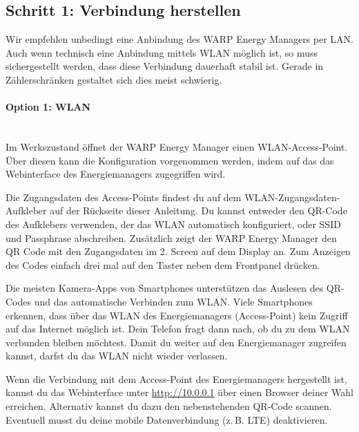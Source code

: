 \documentclass[a4paper,10pt]{article}
\newcommand{\hint}[1]{\begin{tcolorbox}[colback=boxgray,colframe=black,coltext=
white,title=Hinweis,left*=2mm,right*=2mm,boxsep=1mm,bottom=1mm,top=1mm]#1\end{tcolorbox}}
\begin{document}
\begin{multicols*}{2}
	\subsection{Schritt 1: Verbindung herstellen}


	\hint{Wir empfehlen unbedingt eine Anbindung des WARP Energy Managers per
	LAN. Auch wenn technisch eine Anbindung mittels WLAN möglich ist, so muss
	sichergestellt werden, dass diese Verbindung dauerhaft stabil ist. Gerade in
	Zählerschränken gestaltet sich dies meist schwierig.}

	\paragraph{Option 1: WLAN}\ \\
	Im Werkszustand öffnet der WARP Energy Manager einen WLAN-Access-Point. Über diesen kann
	die Konfiguration vorgenommen werden, indem auf das das Webinterface des
	Energiemanagers zugegriffen wird.

	Die Zugangsdaten des Access-Points findest du auf dem WLAN-Zugangsdaten-Aufkleber
	auf der Rückseite dieser Anleitung. Du kannst entweder den QR-Code des Aufklebers verwenden,
	der das WLAN automatisch konfiguriert, oder SSID und Passphrase abschreiben.
    Zusätzlich zeigt der WARP Energy Manager den QR Code mit den Zugangsdaten im 2. Screen auf dem
    Display an. Zum Anzeigen des Codes einfach drei mal auf den Taster neben dem Frontpanel drücken.

	Die meisten Kamera-Apps von Smartphones unterstützen das Auslesen des
	QR-Codes und das automatische Verbinden zum WLAN. Viele Smartphones
	erkennen, dass über das WLAN des Energiemanagers (Access-Point) kein Zugriff auf das
	Internet möglich ist. Dein Telefon fragt dann nach, ob du zu dem WLAN
	verbunden bleiben möchtest. Damit du weiter auf den Energiemanager zugreifen
	kannst, darfst du das WLAN nicht wieder verlassen.

	\begin{minipage}{0.35\textwidth}
		Wenn die Verbindung mit dem Access-Point des Energiemanagers hergestellt ist, kannst du das Webinterface
		unter \url{http://10.0.0.1} über einen Browser deiner Wahl erreichen.
		Alternativ kannst du dazu den nebenstehenden QR-Code scannen.
		Eventuell musst du deine mobile Datenverbindung (z.\,B. LTE) deaktivieren.
	\end{minipage}\hfill
	\begin{minipage}{0.12\textwidth}
		\begin{flushright}
		\end{flushright}
	\end{minipage}


\end{multicols*}
\end{document}
